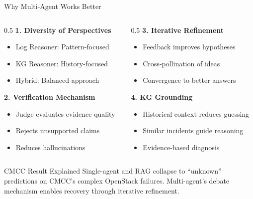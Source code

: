 \documentclass[aspectratio=169]{beamer}
\begin{document}
\begin{frame}{Why Multi-Agent Works Better}
\begin{columns}
\begin{column}{0.5\textwidth}
\textbf{1. Diversity of Perspectives}
\begin{itemize}
    \item Log Reasoner: Pattern-focused
    \item KG Reasoner: History-focused
    \item Hybrid: Balanced approach
\end{itemize}

\vspace{0.5em}
\textbf{2. Verification Mechanism}
\begin{itemize}
    \item Judge evaluates evidence quality
    \item Rejects unsupported claims
    \item Reduces hallucinations
\end{itemize}
\end{column}
\begin{column}{0.5\textwidth}
\textbf{3. Iterative Refinement}
\begin{itemize}
    \item Feedback improves hypotheses
    \item Cross-pollination of ideas
    \item Convergence to better answers
\end{itemize}

\vspace{0.5em}
\textbf{4. KG Grounding}
\begin{itemize}
    \item Historical context reduces guessing
    \item Similar incidents guide reasoning
    \item Evidence-based diagnosis
\end{itemize}
\end{column}
\end{columns}

\vspace{1em}
\begin{alertblock}{CMCC Result Explained}
Single-agent and RAG collapse to ``unknown'' predictions on CMCC's complex OpenStack failures. Multi-agent's debate mechanism enables recovery through iterative refinement.
\end{alertblock}
\end{frame}
\end{document}

